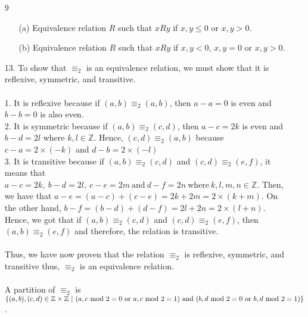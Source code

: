 \documentclass[12pt, a4paper]{article}
\newcommand{\ints}{\mathbb{Z}}
\begin{document}
\begin{itemize}
\item[]
\item[]

\item[9]
\begin{itemize}
\item[(a)]
Equivalence relation $R$ such that $x R y$ if $x, y \leq 0$ or $x, y > 0$.
\item[]

\item[(b)]
Equivalence relation $R$ such that $x R y$ if $x, y < 0$, $x, y = 0$ or $x, y > 0$.
\end{itemize}

\item[]
\item[]

\item[13.]
To show that $\equiv_2$ is an equivalence relation, we must show that it is reflexive, symmetric, and transitive.\\\\
1. It is reflexive because if $(a, b) \equiv_2 (a, b)$, then $a - a = 0$ is even and $b - b = 0$ is also even.\\
2. It is symmetric because if $(a, b) \equiv_2 (c, d)$, then $a - c = 2k$ is even and $b - d = 2l$ where $k, l \in \ints$.
Hence, $(c, d) \equiv_2 (a, b)$ because $c - a = 2 \times (-k)$ and $d - b = 2 \times (-l)$\\
3. It is transitive because if $(a, b) \equiv_2 (c, d)$ and $(c, d) \equiv_2 (e, f)$, it means that
$a - c = 2k,\ b - d = 2l, \ c - e = 2m \ \mbox{and} \ d - f = 2n \ \mbox{where} \ k,l,m,n \in \ints$.
Then, we have that $a - e = (a - c) + (c - e) = 2k + 2m = 2 \times (k + m)$. On the other hand,
$b - f = (b - d) + (d - f) = 2l + 2n = 2 \times (l + n)$. Hence, we got that if $(a, b) \equiv_2 (c, d)$ and $(c, d) \equiv_2 (e, f)$,
then $(a, b) \equiv_2 (e, f)$ and therefore, the relation is transitive.\\\\
Thus, we have now proven that the relation $\equiv_2$ is reflexive, symmetric, and transitive thus, $\equiv_2$ is an equivalence relation.\\\\
A partition of $\equiv_2$ is $\{(a, b), (c, d) \in \ints \times \ints \ | \ (a, c \mbox{ mod } 2 = 0 \mbox{ or } a, c \mbox{ mod } 2 = 1) \mbox{ and }\\ (b, d \mbox{ mod } 2 = 0 \mbox{ or } b, d \mbox{ mod } 2 = 1)\}$.

\item[]
\item[]


\end{itemize}
\end{document}
